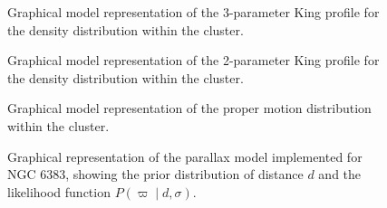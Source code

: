 \documentclass[fleqn,usenatbib,usedcolumn,useAMS]{mnras}
\begin{document}
\begin{figure}
	\centering
    \caption{Graphical model representation of the 3-parameter King profile for the density distribution within the cluster.}
    \label{fig:3king_model}
\end{figure}
\begin{figure}
	\centering
    \caption{Graphical model representation of the 2-parameter King profile for the density distribution within the cluster.}
    \label{fig:2king_model}
\end{figure}
\begin{figure}
	\centering
    \caption{Graphical model representation of the proper motion distribution within the cluster.}
    \label{fig:pm_model}
\end{figure}
\begin{figure}
	\centering
    \caption{Graphical representation of the parallax model implemented for NGC 6383, showing the prior distribution of distance $d$ and the likelihood function $P(\varpi \mid d,\sigma)$.}
    \label{fig:parallax_model}
\end{figure}
\bsp
\label{lastpage}
\end{document}
